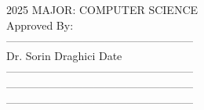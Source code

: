 \begin{flushleft}
    \vspace*{-0.20in}
    \hspace*{3.09in}2025 %
    \hspace*{3.09in}MAJOR: COMPUTER SCIENCE\\ %
    \hspace*{3.09in}Approved By:\\
     \vspace{1cm}
     \hspace*{3.09in}---------------------------------------------------\\
    \vspace*{-0.25in}
    \hspace*{3.09in}Dr. Sorin Draghici\hspace*{1in} Date\hspace*{0.1in}\\
       \vspace{1cm}
    \vspace*{-0.25in}
         \hspace*{3.09in}---------------------------------------------------\\
            \vspace{1cm}
             \vspace*{-0.25in}
         \hspace*{3.09in}---------------------------------------------------\\
            \vspace{1cm}
             \vspace*{-0.25in}
         \hspace*{3.09in}---------------------------------------------------\\
         
\end{flushleft}
